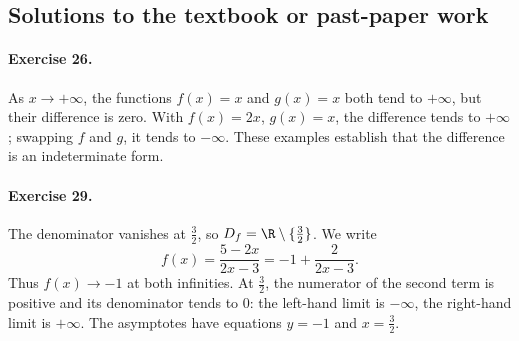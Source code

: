 \subsection{Solutions to the textbook or past-paper work}\paragraph{Exercise 26.} As $x\to+\infty$, the functions $f(x)=x$ and $g(x)=x$ both tend to $+\infty$, but their difference is zero. With $f(x)=2x$, $g(x)=x$, the difference tends to $+\infty$; swapping $f$ and $g$, it tends to $-\infty$. These examples establish that the difference is an indeterminate form.
\paragraph{Exercise 29.} The denominator vanishes at $\frac32$, so $D_f=\R\setminus\{\frac32\}$. We write
\[f(x)=\frac{5-2x}{2x-3}=-1+\frac2{2x-3}.\]
Thus $f(x)\to-1$ at both infinities. At $\frac32$, the numerator of the second term is positive and its denominator tends to $0$: the left-hand limit is $-\infty$, the right-hand limit is $+\infty$. The asymptotes have equations $y=-1$ and $x=\frac32$.

\fi


